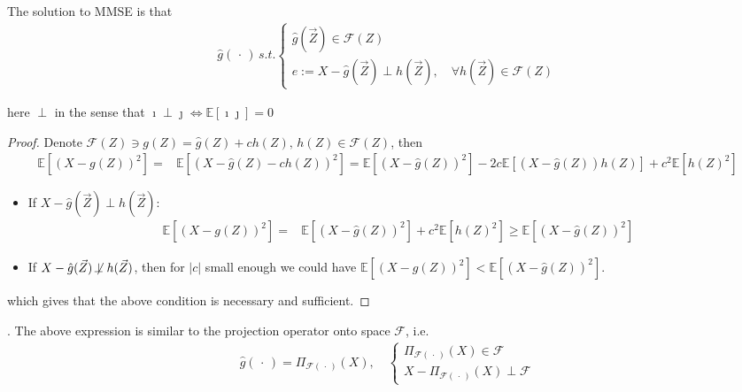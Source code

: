    The solution to MMSE is that
    \begin{align*}
         \hat{g}(\, \cdot \, )\, s.t. \begin{cases}
            \hat{g}(\vec{Z})\in \mathscr{F}(Z)\\
            e:=X-\hat{g}(\vec{Z})\perp h(\vec{Z}),\quad \forall h(\vec{Z})\in\mathscr{F}(Z)
         \end{cases}
    \end{align*}
    
    here $ \perp $ in the sense that $ \imath \perp \jmath \Leftrightarrow \mathbb{E}\left[ \imath\jmath \right]=0  $
    
    \begin{proof}
        Denote $ \mathscr{F}(Z)\ni g(Z)=\hat{g}(Z)+c h(Z)  ,\,h(Z)\in\mathscr{F}(Z)$, then
        \begin{align*}
            \mathbb{E}\left[ (X-g(Z))^2 \right]  =&\mathbb{E}\left[ (X-\hat{g}(Z)-ch(Z))^2 \right]=\mathbb{E}\left[ (X-\hat{g}(Z))^2 \right] -2c\mathbb{E}\left[ (X-\hat{g}(Z))h(Z) \right]+c^2\mathbb{E}\left[ h(Z)^2 \right]  
        \end{align*}
        
        \begin{itemize}[topsep=2pt,itemsep=0pt]
            \item If $ X-\hat{g}(\vec{Z})\perp h(\vec{Z})  $:
            \begin{align*}
                \mathbb{E}\left[ (X-g(Z))^2 \right]  =&\mathbb{E}\left[ (X-\hat{g}(Z))^2 \right] +c^2\mathbb{E}\left[ h(Z)^2 \right]  \geq \mathbb{E}\left[ (X-\hat{g}(Z))^2 \right]
            \end{align*}
            \item If $ X-\hat{g}(\vec{Z})\not\!\perp h(\vec{Z})  $, then for $ |c| $ small enough we could have $ \mathbb{E}\left[ (X-g(Z))^2 \right]< \mathbb{E}\left[ (X-\hat{g}(Z))^2 \right]$.          
        \end{itemize}
        
        which gives that the above condition is  necessary and sufficient.
    \end{proof}
    
    
    
    . The above expression is similar to the projection operator onto space $ \mathscr{F} $, i.e.
    \begin{align*}
        \hat{g}(\, \cdot \, )=\Pi_{\mathscr{F(\, \cdot \, )}}(X),\quad \begin{cases}
            \Pi_{\mathscr{F(\, \cdot \, )}}(X)\in \mathscr{F}\\
            X-\Pi_{\mathscr{F(\, \cdot \, )}}(X)\perp \mathscr{F}
        \end{cases}
    \end{align*}
    
